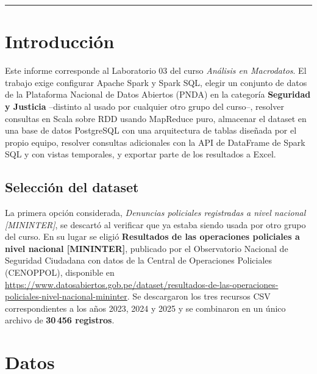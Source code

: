 \documentclass[10pt,a4paper]{article}
\theoremstyle{definition}
\begin{document}

\tableofcontents

\vspace{20pt}
\hrule
\vspace{10pt}

\section{Introducci\'on}

Este informe corresponde al Laboratorio 03 del curso \emph{An\'alisis en Macrodatos}. El trabajo exige
configurar Apache Spark y Spark SQL, elegir un conjunto de datos de la Plataforma Nacional de Datos
Abiertos (PNDA) en la categor\'ia \textbf{Seguridad y Justicia} --distinto al usado por cualquier otro
grupo del curso--, resolver consultas en Scala sobre RDD usando MapReduce puro, almacenar el dataset en
una base de datos PostgreSQL con una arquitectura de tablas dise\~nada por el propio equipo, resolver
consultas adicionales con la API de DataFrame de Spark SQL y con vistas temporales, y exportar parte de
los resultados a Excel.

\subsection{Selecci\'on del dataset}
La primera opci\'on considerada, \emph{Denuncias policiales registradas a nivel nacional [MININTER]},
se descart\'o al verificar que ya estaba siendo usada por otro grupo del curso. En su lugar se eligi\'o
\textbf{Resultados de las operaciones policiales a nivel nacional [MININTER]}, publicado por el
Observatorio Nacional de Seguridad Ciudadana con datos de la Central de Operaciones Policiales
(CENOPPOL), disponible en
\url{https://www.datosabiertos.gob.pe/dataset/resultados-de-las-operaciones-policiales-nivel-nacional-mininter}.
Se descargaron los tres recursos CSV correspondientes a los a\~nos 2023, 2024 y 2025 y se combinaron en
un \'unico archivo de \textbf{30\,456 registros}.

\section{Datos}
\end{document}
